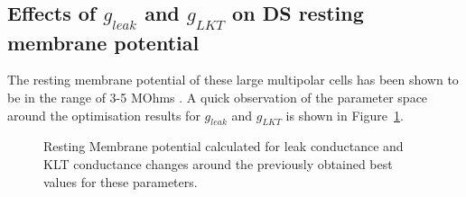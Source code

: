 


\subsection{Effects of $g_{leak}$ and $g_{LKT}$ on DS resting membrane
  potential}

The resting membrane potential of these large multipolar cells has been shown to
be in the range of 3-5 MOhms . A quick
observation of the parameter space around the optimisation results for
$g_{leak}$ and $g_{LKT}$ is shown in Figure~\ref{fig:leakVltk}.

\begin{figure}[h!]
  \centering 
{}
  \caption{Resting Membrane potential calculated for leak conductance and KLT
    conductance changes around the previously obtained best values for these
    parameters.}\label{fig:leakVltk}
\end{figure}




